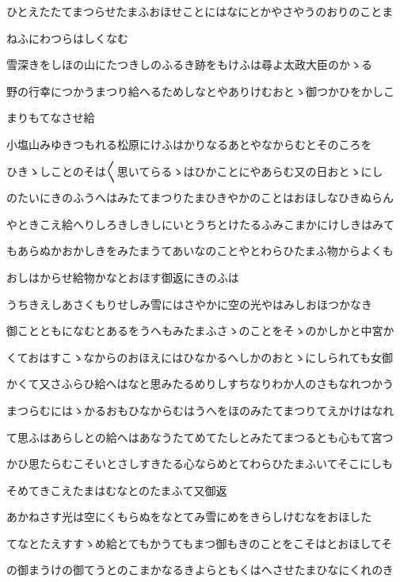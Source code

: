 \documentclass[a4paper,11pt,landscape]{ltjtarticle}
\begin{document}
\par\medskip
ひとえたたてまつらせたまふおほせことにはなにとかやさやうのおりのことま
\par\medskip
ねふにわつらはしくなむ
\par\medskip
雪深きをしほの山にたつきしのふるき跡をもけふは尋よ太政大臣のかゝる
\par\medskip
野の行幸につかうまつり給へるためしなとやありけむおとゝ御つかひをかしこ
\par\medskip
まりもてなさせ給
\par\medskip
小塩山みゆきつもれる松原にけふはかりなるあとやなからむとそのころを
\par\medskip
ひきゝしことのそは〱思いてらるゝはひかことにやあらむ又の日おとゝにし
\par\medskip
のたいにきのふうへはみたてまつりたまひきやかのことはおほしなひきぬらん
\par\medskip
やときこえ給へりしろきしきしにいとうちとけたるふみこまかにけしきはみて
\par\medskip
もあらぬかおかしきをみたまうてあいなのことやとわらひたまふ物からよくも
\par\medskip
おしはからせ給物かなとおほす御返にきのふは
\par\medskip
うちきえしあさくもりせしみ雪にはさやかに空の光やはみしおほつかなき
\par\medskip
御ことともになむとあるをうへもみたまふさゝのことをそゝのかしかと中宮か
\par\medskip
くておはすこゝなからのおほえにはひなかるへしかのおとゝにしられても女御
\par\medskip
かくて又さふらひ給へはなと思みたるめりしすちなりわか人のさもなれつかう
\par\medskip
まつらむにはゝかるおもひなからむはうへをほのみたてまつりてえかけはなれ
\par\medskip
て思ふはあらしとの給へはあなうたてめてたしとみたてまつるとも心もて宮つ
\par\medskip
かひ思たらむこそいとさしすきたる心ならめとてわらひたまふいてそこにしも
\par\medskip
そめてきこえたまはむなとのたまふて又御返
\par\medskip
あかねさす光は空にくもらぬをなとてみ雪にめをきらしけむなをおほした
\par\medskip
てなとたえすすゝめ給とてもかうてもまつ御もきのことをこそはとおほしてそ
\par\medskip
の御まうけの御てうとのこまかなるきよらともくはへさせたまひなにくれのき
\par\medskip
\end{document}
